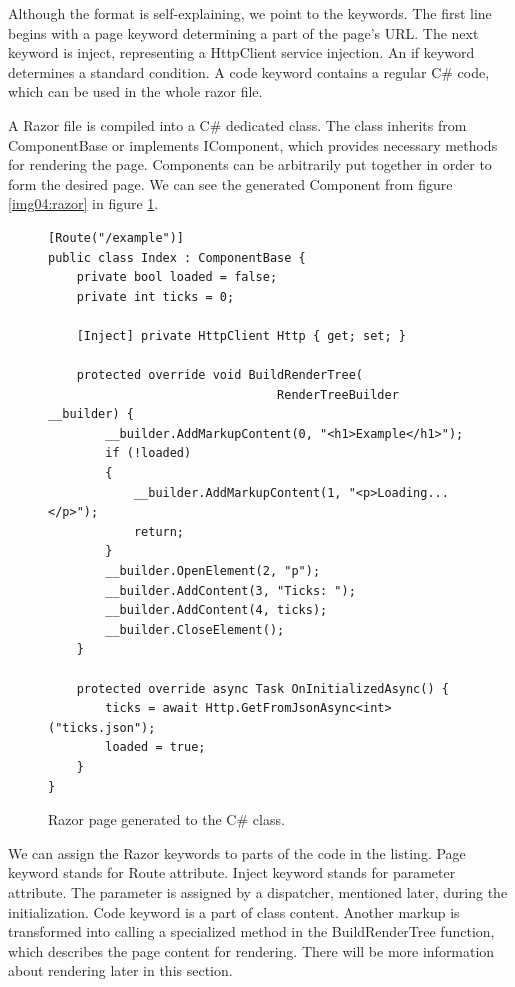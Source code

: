 Although the format is self-explaining, we point to the keywords.
The first line begins with a page keyword determining a part of the page's URL.
The next keyword is inject, representing a HttpClient service injection. 
An if keyword determines a standard condition.
A code keyword contains a regular C\# code, which can be used in the whole razor file.
\par
A Razor file is compiled into a C\# dedicated class.
The class inherits from ComponentBase or implements IComponent, which provides necessary methods for rendering the page.
Components can be arbitrarily put together in order to form the desired page.
We can see the generated Component from figure \ref{img04:razor} in figure \ref{img05:component}.
\par
\begin{figure}
\begin{lstlisting}
[Route("/example")]
public class Index : ComponentBase {
    private bool loaded = false;
    private int ticks = 0;
	
    [Inject] private HttpClient Http { get; set; }

    protected override void BuildRenderTree(
    							RenderTreeBuilder __builder) {
        __builder.AddMarkupContent(0, "<h1>Example</h1>");
        if (!loaded)
        {
            __builder.AddMarkupContent(1, "<p>Loading...</p>");
            return;
        }
        __builder.OpenElement(2, "p");
        __builder.AddContent(3, "Ticks: ");
        __builder.AddContent(4, ticks);
        __builder.CloseElement();
    }

    protected override async Task OnInitializedAsync() {
        ticks = await Http.GetFromJsonAsync<int>("ticks.json");
        loaded = true;
    }
}
\end{lstlisting}
\caption{Razor page generated to the C\# class.}
\label{img05:component}
\end{figure}
\par
We can assign the Razor keywords to parts of the code in the listing.
Page keyword stands for Route attribute.
Inject keyword stands for parameter attribute. The parameter is assigned by a dispatcher, mentioned later, during the initialization.
Code keyword is a part of class content.
Another markup is transformed into calling a specialized method in the BuildRenderTree function, which describes the page content for rendering. 
There will be more information about rendering later in this section.
